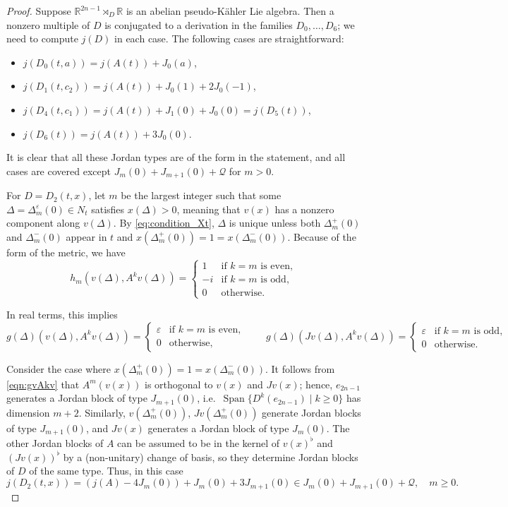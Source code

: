 \documentclass{article}
\theoremstyle{definition}
\newcommand{\R}{\mathbb{R}}
\newcommand{\Span}[1]{\operatorname{Span}\{#1\}}
\begin{document}
\begin{proof}
    Suppose $\R^{2n-1}\rtimes_D\R$ is an abelian pseudo-Kähler Lie algebra. Then a nonzero multiple of $D$ is conjugated to a derivation in the families $D_0,\dotsc, D_6$; we need to compute $j(D)$ in each case. The following cases are straightforward: \begin{itemize}
        \item $j(D_0(t,a))=j(A(t))+J_0(a)$,
        \item $j(D_1(t,c_2))=j(A(t))+J_0(1)+2J_0(-1)$,
        \item $j(D_4(t,c_1))=j(A(t))+J_1(0)+J_0(0)=j(D_5(t))$,
        \item $j(D_6(t))=j(A(t))+3J_0(0)$.
    \end{itemize}

    It is clear that all these Jordan types are of the form in the statement, and all cases are covered  except $J_m(0)+J_{m+1}(0)+\mathcal{Q}$ for $m>0$.\medskip

    For $D=D_2(t,x)$, let $m$ be the largest integer such that some $\Delta=\Delta_m^\varepsilon(0)\in N_t$ satisfies $x(\Delta)>0$, meaning that $v(x)$ has a nonzero component along $v(\Delta)$. By \eqref{eq:condition_Xt}, $\Delta$ is unique unless both $\Delta_m^+(0)$ and $\Delta_m^-(0)$ appear in $t$ and $x(\Delta_m^+(0))=1=x(\Delta_m^-(0))$. Because of the form of the metric, we have $$h_m(v(\Delta),A^kv(\Delta))=\begin{cases}
        1&\text{if }k=m\text{ is even},\\
        -i&\text{if }k=m\text{ is odd},\\
        0&\text{otherwise}.
    \end{cases}$$

    In real terms, this implies \begin{equation}\label{eqn:gvAkv}
        g(\Delta)(v(\Delta),A^kv(\Delta))=\begin{cases}
            \varepsilon&\text{if }k=m\text{ is even},\\
            0&\text{otherwise},
        \end{cases}\qquad g(\Delta)(Jv(\Delta),A^kv(\Delta))=\begin{cases}
            \varepsilon&\text{if }k=m\text{ is odd},\\
            0&\text{otherwise}.
        \end{cases}
    \end{equation}

    Consider the case where $x(\Delta_m^+(0))=1=x(\Delta_m^-(0))$. It follows from \eqref{eqn:gvAkv} that $A^m(v(x))$ is orthogonal to $v(x)$ and $Jv(x)$; hence, $e_{2n-1}$ generates a Jordan block of type $J_{m+1}(0)$, i.e.\ $\Span{D^k(e_{2n-1})\mid k\geq 0}$ has dimension $m+2$. Similarly, $v(\Delta_{m}^+(0))$, $Jv(\Delta_{m}^+(0))$ generate Jordan blocks of type $J_{m+1}(0)$, and $Jv(x)$ generates a Jordan block of type $J_m(0)$. The other Jordan blocks of $A$ can be assumed to be in the kernel of $v(x)^\flat$ and $(Jv(x))^\flat$ by a (non-unitary) change of basis, so they determine Jordan blocks of $D$ of the same type. Thus, in this case $$j(D_2(t,x))=(j(A)-4J_m(0))+J_{m}(0)+3J_{m+1}(0)\in J_{m}(0)+J_{m+1}(0)+\mathcal{Q},\quad m\geq0.$$


\end{proof}
\end{document}
